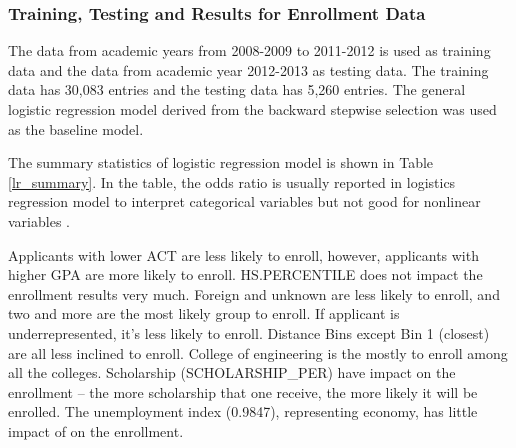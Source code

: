 \documentclass[12pt,english]{report}
\begin{document}
\begin{table}
\end{table}


\subsubsection{Training, Testing and Results for Enrollment Data}
The data from academic years from 2008-2009 to 2011-2012 is used as training
data  and the data from academic year 2012-2013 as testing data. The training
data has 30,083 entries and the testing data has 5,260 entries. The general
logistic regression model derived from the backward stepwise selection was used
as the baseline model.


The summary statistics of logistic regression model is shown in Table 
\ref{lr_summary}.  In the table, the odds ratio is usually reported in
logistics regression model to interpret categorical variables but not good for
nonlinear variables \citep{DesJardins2006, long2006regression}. 


Applicants with lower ACT are less likely to  enroll, however, applicants with
higher GPA are more likely to enroll. HS.PERCENTILE does not impact the
enrollment results very much. Foreign and unknown are less likely to enroll,
and two and more are the most likely  group to enroll. If applicant is
underrepresented, it's less likely to enroll. Distance Bins except Bin 1
(closest) are all less inclined to  enroll. College  of engineering is the
mostly to enroll among all the colleges. Scholarship (SCHOLARSHIP\_PER) have
impact on the enrollment -- the more scholarship that  one receive, the more
likely it will be enrolled. The unemployment index (0.9847), representing
economy, has little impact of on the enrollment.
\end{document}
